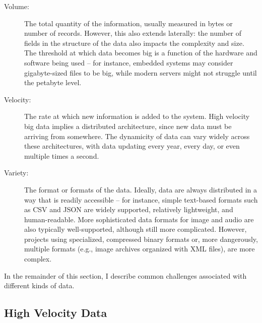 \begin{description}
	\item[Volume:] The total quantity of the information, usually measured in bytes or number of records. However, this also extends laterally: the number of fields in the structure of the data also impacts the complexity and size. The threshold at which data becomes big is a function of the hardware and software being used -- for instance, embedded systems may consider gigabyte-sized files to be big, while modern servers might not struggle until the petabyte level.
	\item[Velocity:] The rate at which new information is added to the system. High velocity big data implies a distributed architecture, since new data must be arriving from somewhere. The dynamicity of data can vary widely across these architectures, with data updating every year, every day, or even multiple times a second.
	\item[Variety:] The format or formats of the data. Ideally, data are always distributed in a way that is readily accessible -- for instance, simple text-based formats such as CSV and JSON are widely supported, relatively lightweight, and human-readable. More sophisticated data formats for image and audio are also typically well-supported, although still more complicated. However, projects using specialized, compressed binary formats or, more dangerously, multiple formats (e.g., image archives organized with XML files), are more complex.
\end{description}

In the remainder of this section, I describe common challenges associated with different kinds of data.

\subsection{High Velocity Data}

